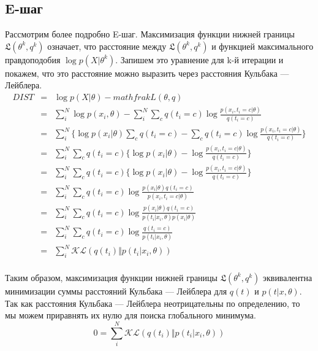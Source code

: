 \subsection{E-шаг}
Рассмотрим более подробно E-шаг. 
Максимизация функции нижней границы $\mathfrak{L}(\theta^k, q^k)$ означает, что расстояние между $\mathfrak{L}(\theta^k, q^k)$ и функцией максимального правдоподобия $\log p \left(  X \vert	\theta^k \right)$. 
Запишем это уравнение для k-й итерации и покажем, что это расстояние можно выразить через расстояния Кульбака — Лейблера.
\begin{eqnarray*} \label{eq:em4}
DIST & = & \log p \left( X \vert \theta \right) - mathfrak{L}(\theta, q) \\
       & = & \sum_i^N \log p \left( x_i,\theta \right) - \sum_i^N \sum_c q(t_i = c) \log \frac{p \left( x_i,t_i=c \vert \theta \right)}{q(t_i=c)} \\
       & = & \sum_i^N  \big\{ \log p \left( x_i \vert \theta \right) \sum_c q(t_i=c) - \sum_c q(t_i = c) \log \frac{p \left( x_i,t_i=c \vert \theta \right)}{q(t_i=c)} \big\} \\
       & = & \sum_i^N \sum_c q(t_i = c) \big\{ \log p \left( x_i \vert \theta \right) - \log \frac{p \left( x_i,t_i=c \vert \theta \right)}{q(t_i=c)} \big\} \\
       & = & \sum_i^N \sum_c q(t_i = c) \big\{ \log p \left( x_i \vert \theta \right) - \log \frac{p \left( x_i,t_i=c \vert \theta \right)}{q(t_i=c)} \big\} \\
       & = & \sum_i^N \sum_c q(t_i = c) \log  \frac{p \left( x_i \vert \theta \right) q(t_i=c)}{p \left( x_i,t_i=c \vert \theta \right)}  \\
       & = & \sum_i^N \sum_c q(t_i = c) \log  \frac{p \left( x_i \vert \theta \right) q(t_i=c)}{p \left( t_i \vert x_i,\theta \right) p \left( x_i \vert \theta \right)}  \\
       & = & \sum_i^N \sum_c q(t_i = c) \log  \frac{ q(t_i=c)}{p \left( t_i \vert x_i,\theta \right) }  \\
       & = & \sum_i^N \mathcal{KL}( q(t_i)  \Vert   p \left( t_i \vert x_i, \theta \right) )\\
\end{eqnarray*}

Таким образом, максимизация функции нижней границы $\mathfrak{L}(\theta^k, q^k)$ эквивалентна минимизации суммы расстояний Кульбака — Лейблера для $q(t)$ и $p \left( t \vert x, \theta \right)$. 
Так как расстояния Кульбака — Лейблера неотрицательны по определению, то мы можем приравнять их нулю для поиска глобального минимума.
\begin{equation} \label{eq:em5}
0 = \sum_i^N \mathcal{KL}( q(t_i)  \Vert   p \left( t_i \vert x_i, \theta \right) ) 
\end{equation}

